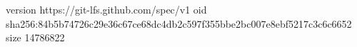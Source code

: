 version https://git-lfs.github.com/spec/v1
oid sha256:84b5b74726c29e36c67ce68dc4db2c597f355bbe2bc007e8ebf5217c3c6c6652
size 14786822
